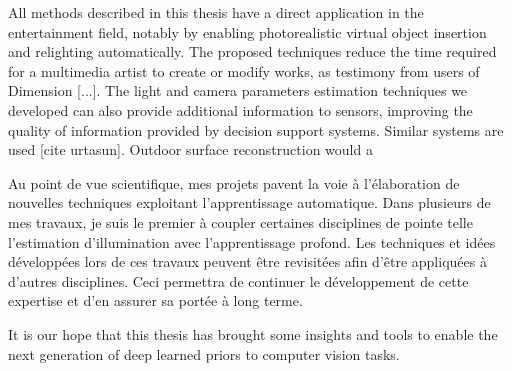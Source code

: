 All methods described in this thesis have a direct application in the entertainment field, notably by enabling photorealistic virtual object insertion and relighting automatically. The proposed techniques reduce the time required for a multimedia artist to create or modify works, as testimony from users of Dimension [...]. The light and camera parameters estimation techniques we developed can also provide additional information to sensors, improving the quality of information provided by decision support systems. Similar systems are used [cite urtasun]. Outdoor surface reconstruction would a 

Au point de vue scientifique, mes projets pavent la voie à l’élaboration de nouvelles techniques exploitant l’apprentissage automatique. Dans plusieurs de mes travaux, je suis le premier à coupler certaines disciplines de pointe telle l’estimation d’illumination avec l’apprentissage profond. Les techniques et idées développées lors de ces travaux peuvent être revisitées afin d’être appliquées à d’autres disciplines. Ceci permettra de continuer le développement de cette expertise et d’en assurer sa portée à long terme. 

It is our hope that this thesis has brought some insights and tools to enable the next generation of deep learned priors to computer vision tasks. 
